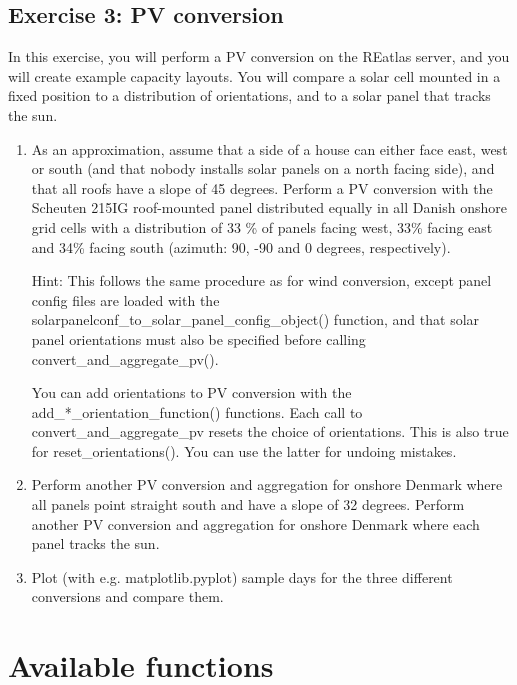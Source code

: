 \documentclass[a4paper,10pt]{article}
\begin{document}
\begin{enumerate}
\end{enumerate}

\subsection{Exercise 3: PV conversion}

In this exercise, you will perform a PV conversion on the REatlas server,
and you will create example capacity layouts.
You will compare a solar cell mounted in a fixed position to 
a distribution of orientations, and to a solar panel that tracks the sun.


\begin{enumerate}
     \item As an approximation, assume that a side of a house can either face
          east, west or south (and that nobody installs solar panels on a north facing side), and that all roofs have a slope of 45 degrees.
          Perform a PV conversion with the Scheuten 215IG roof-mounted panel
          distributed equally in all Danish onshore grid cells
          with a distribution of 33 \% of panels facing west, 33\% facing east
          and 34\% facing south (azimuth: 90, -90 and 0 degrees, respectively).
          
          Hint: This follows the same procedure as for wind conversion,
          except panel config files are loaded with the
          solarpanelconf\_to\_solar\_panel\_config\_object() function,
          and that solar panel orientations must also be specified before
          calling convert\_and\_aggregate\_pv().

          You can add orientations to PV conversion with the add\_*\_orientation\_function() functions.
          Each call to convert\_and\_aggregate\_pv resets the choice of orientations. This is also true for reset\_orientations().
          You can use the latter for undoing mistakes.

     \item Perform another PV conversion and aggregation for onshore Denmark
           where all panels point straight south and have a slope of 32 degrees.
           Perform another PV conversion and aggregation for onshore Denmark
           where each panel tracks the sun.
      \item Plot (with e.g. matplotlib.pyplot) sample days for the three
           different conversions and compare them.
\end{enumerate}


\section{Available functions}
\end{document}
